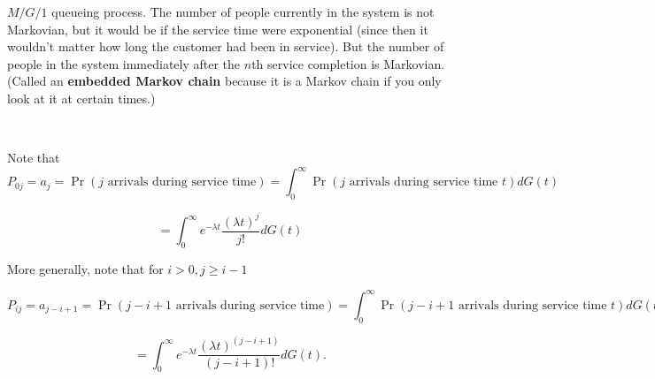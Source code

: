 \begin{example} \(M/G/1\) queueing process. The number of people currently in the system is not Markovian, but it would be if the service time were exponential (since then it wouldn't matter how long the customer had been in service). But the number of people in the system immediately after the \(n\)th service completion is Markovian. (Called an \textbf{embedded Markov chain} because it is a Markov chain if you only look at it at certain times.) 

\

Note that 
\[
P_{0j} = a_j = \Pr(j \text{ arrivals during service time}) = \int_0^\infty  \Pr(j \text{ arrivals during service time } t) dG(t)
\]

\[
= \int_0^\infty e^{-\lambda t} \frac{ (\lambda t)^j }{j!} dG(t)
\]

More generally, note that for \(i > 0, j \geq i - 1\)

\[
P_{ij} = a_{j-i+1} = \Pr(j - i + 1 \text{ arrivals during service time}) = \int_0^\infty  \Pr(j - i + 1  \text{ arrivals during service time } t) dG(t)
\]

\[
= \int_0^\infty e^{-\lambda t} \frac{ (\lambda t)^(j - i + 1 ) }{(j - i + 1 )!} dG(t).
\]

%
%

\end{example}

